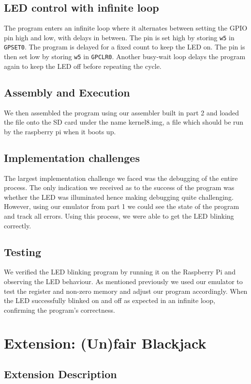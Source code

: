 \documentclass[9pt,a4paper,twoside]{tau-class/tau}
\begin{document}
    \subsection{LED control with infinite loop} 
    The program enters an infinite loop where it alternates between setting the GPIO pin high and low, with delays in between. The pin is set high by storing \texttt{w5} in \texttt{GPSET0}. The program is delayed for a fixed count to keep the LED on. The pin is then set low by storing \texttt{w5} in \texttt{GPCLR0}. Another busy-wait loop delays the program again to keep the LED off before repeating the cycle. 
    
    \subsection{Assembly and Execution}   
    We then assembled the program using our assembler built in part 2 and loaded the file onto the SD card under the name kernel8.img, a file which should be run by the raspberry pi when it boots up. 
    
    \subsection{Implementation challenges}  
    The largest implementation challenge we faced was the debugging of the entire process. The only indication we received as to the success of the program was whether the LED was illuminated hence making debugging quite challenging. However, using our emulator from part 1 we could see the state of the program and track all errors.  Using this process, we were able to get the LED blinking correctly.  

    \subsection{Testing}
    We verified the LED blinking program by running it on the Raspberry Pi and observing the LED behaviour. As mentioned previously we used our emulator to test the register and non-zero memory and adjust our program accordingly. When  the LED successfully blinked on and off as expected in an infinite loop, confirming the program's correctness. 

    \section{Extension: (Un)fair Blackjack}
    \subsection{Extension Description} 
    
\end{document}
